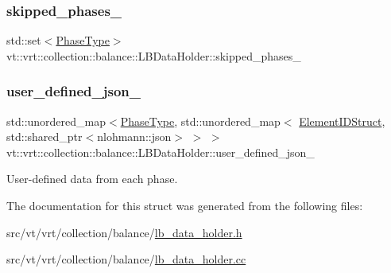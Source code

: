 \subsubsection{\texorpdfstring{skipped\+\_\+phases\+\_\+}{skipped\_phases\_}}
{\footnotesize\ttfamily std\+::set$<$\hyperlink{namespacevt_a46ce6733d5cdbd735d561b7b4029f6d7}{Phase\+Type}$>$ vt\+::vrt\+::collection\+::balance\+::\+L\+B\+Data\+Holder\+::skipped\+\_\+phases\+\_\+}

\mbox{\label{structvt_1_1vrt_1_1collection_1_1balance_1_1_l_b_data_holder_a38dc8aada18756357212f4229ea363da}} 
\subsubsection{\texorpdfstring{user\+\_\+defined\+\_\+json\+\_\+}{user\_defined\_json\_}}
{\footnotesize\ttfamily std\+::unordered\+\_\+map$<$\hyperlink{namespacevt_a46ce6733d5cdbd735d561b7b4029f6d7}{Phase\+Type}, std\+::unordered\+\_\+map$<$ \hyperlink{namespacevt_1_1vrt_1_1collection_1_1balance_a9f5b53fafb270212279a4757d2c4cd28}{Element\+I\+D\+Struct}, std\+::shared\+\_\+ptr$<$nlohmann\+::json$>$ $>$ $>$ vt\+::vrt\+::collection\+::balance\+::\+L\+B\+Data\+Holder\+::user\+\_\+defined\+\_\+json\+\_\+}



User-\/defined data from each phase. 



The documentation for this struct was generated from the following files\+:\begin{DoxyCompactItemize}
\item 
src/vt/vrt/collection/balance/\hyperlink{lb__data__holder_8h}{lb\+\_\+data\+\_\+holder.\+h}\item 
src/vt/vrt/collection/balance/\hyperlink{lb__data__holder_8cc}{lb\+\_\+data\+\_\+holder.\+cc}\end{DoxyCompactItemize}
